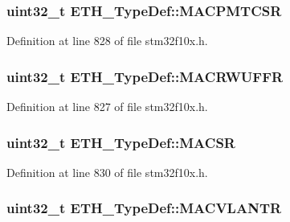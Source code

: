 \subsubsection[{\texorpdfstring{M\+A\+C\+P\+M\+T\+C\+SR}{MACPMTCSR}}]{ {\bf uint32\+\_\+t} E\+T\+H\+\_\+\+Type\+Def\+::\+M\+A\+C\+P\+M\+T\+C\+SR}\hypertarget{struct_e_t_h___type_def_a1deaafa44dbc3c8a2daaaf317dee5624}{}\label{struct_e_t_h___type_def_a1deaafa44dbc3c8a2daaaf317dee5624}


Definition at line 828 of file stm32f10x.\+h.

\subsubsection[{\texorpdfstring{M\+A\+C\+R\+W\+U\+F\+FR}{MACRWUFFR}}]{ {\bf uint32\+\_\+t} E\+T\+H\+\_\+\+Type\+Def\+::\+M\+A\+C\+R\+W\+U\+F\+FR}\hypertarget{struct_e_t_h___type_def_a8cd8da723ca1469d767de1334e16ec9d}{}\label{struct_e_t_h___type_def_a8cd8da723ca1469d767de1334e16ec9d}


Definition at line 827 of file stm32f10x.\+h.

\subsubsection[{\texorpdfstring{M\+A\+C\+SR}{MACSR}}]{ {\bf uint32\+\_\+t} E\+T\+H\+\_\+\+Type\+Def\+::\+M\+A\+C\+SR}\hypertarget{struct_e_t_h___type_def_a9bee2fa58555f6725fc14a8d42484d42}{}\label{struct_e_t_h___type_def_a9bee2fa58555f6725fc14a8d42484d42}


Definition at line 830 of file stm32f10x.\+h.

\subsubsection[{\texorpdfstring{M\+A\+C\+V\+L\+A\+N\+TR}{MACVLANTR}}]{ {\bf uint32\+\_\+t} E\+T\+H\+\_\+\+Type\+Def\+::\+M\+A\+C\+V\+L\+A\+N\+TR}\hypertarget{struct_e_t_h___type_def_a0792c8c170502e3466518d200ca297c3}{}\label{struct_e_t_h___type_def_a0792c8c170502e3466518d200ca297c3}


